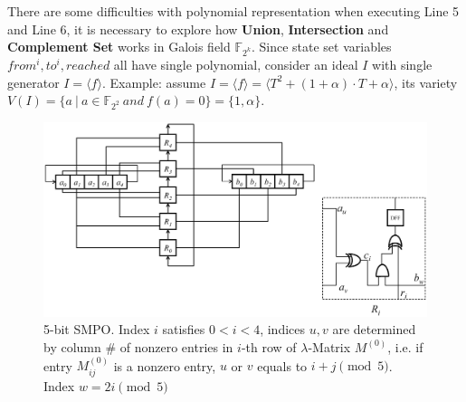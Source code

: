 There are some difficulties with polynomial representation when executing Line 5 and Line 6, it is necessary to explore
how \textbf{Union}, \textbf{Intersection} and \textbf{Complement Set} works in Galois field $\mathbb{F}_{2^k}$. Since
state set variables $from^i, to^i, reached$ all have single polynomial, consider an ideal $I$ with single generator $I = \langle f\rangle $.
Example: assume $I = \langle f\rangle  = \langle T^2 + (1+\alpha)\cdot T+\alpha\rangle $, its variety $V(I) = \{a\ |\ a \in \mathbb{F}_{2^2}\ and\ f(a) = 0\} = \{1, \alpha\}$.


\begin{figure}[tb]
\begin{center}
\includegraphics[width=\textwidth]{mySMPO.eps}
\caption{5-bit SMPO. Index $i$ satisfies $0<i<4$, indices $u,v$ are determined by column \# of nonzero entries in $i$-th row of $\lambda$-Matrix $M^{(0)}$, i.e. if entry $M_{ij}^{(0)}$ is a nonzero entry, $u$ or $v$ equals to $i+j \pmod 5$. Index $w = 2i\pmod 5$}
\end{center}
\label{fig:SMPO}
\end{figure}

